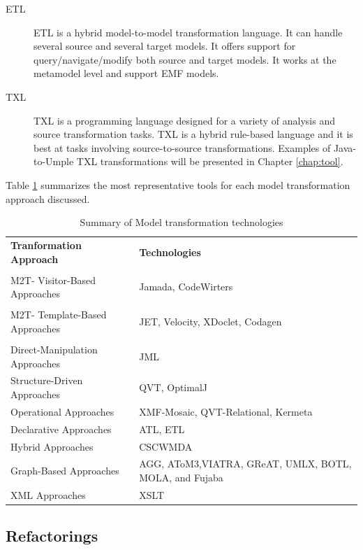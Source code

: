 \begin{description}
\item[ETL]
ETL \cite{ETLMain}  is a hybrid model-to-model transformation language. It can handle several source and several target models. It offers support for query/navigate/modify both source and target models. It works at the metamodel level and support EMF models. 

\item[TXL]
TXL \cite{Cordy2006}  is a programming language designed for a variety of analysis and source transformation tasks. TXL is a hybrid rule-based language and it is best at tasks involving source-to-source transformations.  Examples of Java-to-Umple TXL transformations will be presented in Chapter \ref{chap:tool}.
\end{description}

Table \ref{table:toolSummary} summarizes the most representative tools for each model transformation approach discussed.

\begin{table}[h]
\caption{Summary of Model transformation technologies}
\label{table:toolSummary}
\begin{tabularx}{\textwidth}{X|X}
\toprule
\rowcolor[HTML]{BBDAFF}
\textbf{Tranformation Approach} & \textbf{Technologies}     \\  \\ \hline
M2T- Visitor-Based Approaches & Jamada, CodeWirters  \\  \\ \hline
M2T- Template-Based Approaches  & JET, Velocity, XDoclet, Codagen  \\ \\ \hline
\hline
Direct-Manipulation Approaches & JML   \\ \hline
Structure-Driven Approaches & QVT, OptimalJ   \\ \hline
Operational Approaches & XMF-Mosaic, QVT-Relational, Kermeta  \\ \hline
Declarative Approaches & ATL, ETL    \\ \hline
Hybrid Approaches & CSCWMDA   \\ \hline
Graph-Based Approaches & AGG, AToM3,VIATRA, GReAT, UMLX, BOTL, MOLA, and Fujaba  \\ \hline
XML Approaches & XSLT   \\ \hline
\end{tabularx}
\end{table}

\subsection{Refactorings}


